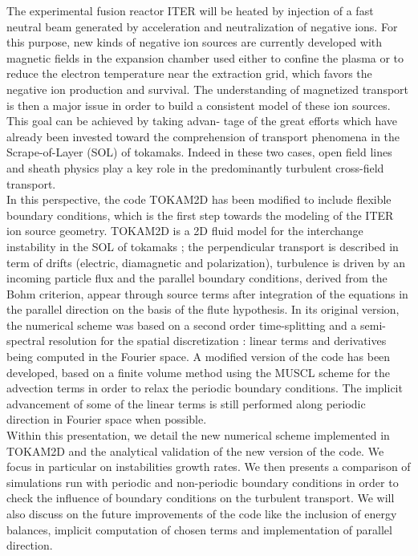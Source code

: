 \documentclass[12pt]{article}
\begin{document}
\small{The experimental fusion reactor ITER will be heated by injection of a fast neutral
beam generated by acceleration and neutralization of negative ions. For this purpose,
new kinds of negative ion sources are currently developed with magnetic fields in the
expansion chamber used either to confine the plasma or to reduce the electron temperature 
near the extraction grid, which favors the negative ion production and survival.
The understanding of magnetized transport is then a major issue in order to build
a consistent model of these ion sources. This goal can be achieved by taking advan-
tage of the great efforts which have already been invested toward the comprehension
of transport phenomena in the Scrape-of-Layer (SOL) of tokamaks. Indeed in these
two cases, open field lines and sheath physics play a key role in the predominantly
turbulent cross-field transport.
\\

In this perspective, the code TOKAM2D has been modified to include flexible
boundary conditions, which is the first step towards the modeling of the ITER ion
source geometry. TOKAM2D is a 2D fluid model for the interchange instability in the
SOL of tokamaks ; the perpendicular transport is described in term of drifts (electric,
diamagnetic and polarization), turbulence is driven by an incoming particle flux and
the parallel boundary conditions, derived from the Bohm criterion, appear through
source terms after integration of the equations in the parallel direction on the basis
of the flute hypothesis. In its original version, the numerical scheme was based on a
second order time-splitting and a semi-spectral resolution for the spatial discretization
: linear terms and derivatives being computed in the Fourier space.
A modified version of the code has been developed, based on a finite volume method
using the MUSCL scheme for the advection terms in order to relax the periodic boundary 
conditions. The implicit advancement of some of the linear terms is still performed
along periodic direction in Fourier space when possible.
\\

Within this presentation, we detail the new numerical scheme implemented in TO\-KAM2D
and the analytical validation of the new version of the code. We focus in particular on
instabilities growth rates. We then presents a comparison of simulations run with periodic
and non-periodic boundary conditions in order to check the influence of boundary
conditions on the turbulent transport. We will also discuss on the future improvements
of the code like the inclusion of energy balances, implicit computation of chosen terms
and implementation of parallel direction.}
\end{document}
